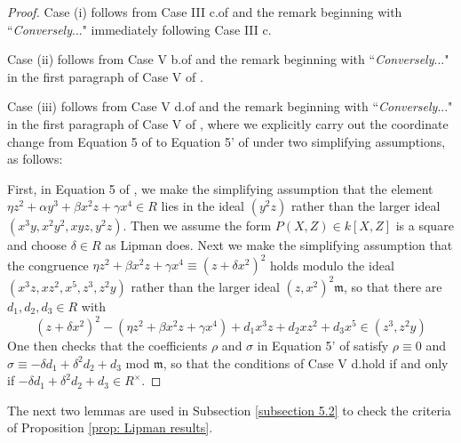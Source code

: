 \documentclass[12pt]{amsart}
\numberwithin{equation}{section}
\theoremstyle{definition}
\newtheorem{remark}[equation]{Remark}
\newcommand{\m}{\mathfrak{m}}
\begin{document}
\begin{proof}
    Case (i) follows from Case III c.\;of \cite[Section 24, pg.\,265]{Lip69} and the remark beginning with ``\textit{Conversely}..." immediately following Case III c.

    Case (ii) follows from Case V b.\;of \cite[Section 24, pg.\,268]{Lip69} and the remark beginning with ``\textit{Conversely}..." in the first paragraph of Case V of  \cite[Section 24, pg.\,268]{Lip69}.

    Case (iii) follows from Case V d.\;of \cite[Section 24, pg.\,268]{Lip69} and the remark beginning with ``\textit{Conversely}..." in the first paragraph of Case V of \cite[Section 24, pg.\,268]{Lip69}, where we explicitly carry out the coordinate change from Equation 5 of \cite[Section 24, pg.\,267]{Lip69} to Equation 5' of \cite[Section 24, pg.\,268]{Lip69} under two simplifying assumptions, as follows:

    First, in Equation 5 of \cite[Section 24, pg.\,267]{Lip69}, we make the simplifying assumption that the element $\eta z^2+\alpha y^3+\beta x^2z+\gamma x^4\in R$ lies in the ideal $(y^2z)$ rather than the larger ideal $(x^3y,x^2y^2,xyz,y^2z)$. Then we assume the form $P(X,Z)\in k[X,Z]$ is a square and choose $\delta\in R$ as Lipman does. Next we make the simplifying assumption that the congruence $\eta z^2+\beta x^2z+\gamma x^4\equiv(z+\delta x^2)^2$ holds modulo the ideal $(x^3z,xz^2,x^5,z^3,z^2y)$ rather than the larger ideal $(z,x^2)^2\m$, so that there are $d_1,d_2,d_3\in R$ with
    \[(z+\delta x^2)^2-(\eta z^2+\beta x^2z+\gamma x^4)+d_1x^3z+d_2xz^2+d_3x^5\in(z^3,z^2y)\]
    One then checks that the coefficients $\rho$ and $\sigma$ in Equation 5' of \cite[Section 24, pg.\,268]{Lip69} satisfy $\rho\equiv 0$ and $\sigma\equiv-\delta d_1+\delta^2d_2+d_3$  mod $\m$, so that the conditions of Case V d.\;hold if and only if $-\delta d_1+\delta^2d_2+d_3\in R^\times$.
\end{proof}

The next two lemmas are used in Subsection \ref{subsection 5.2} to check the criteria of Proposition \ref{prop: Lipman results}.
\end{document}
